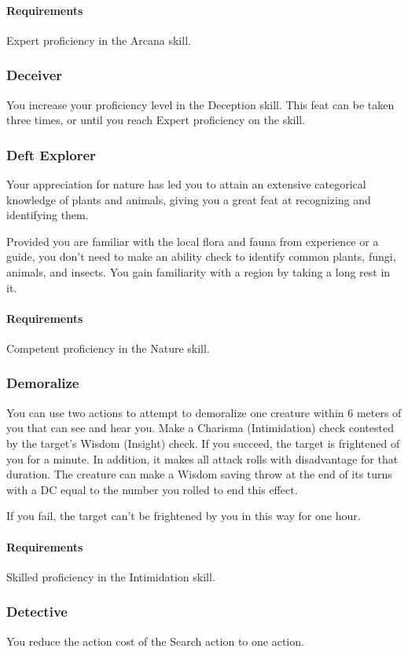     \paragraph{Requirements} Expert proficiency in the Arcana skill.
\subsubsection{Deceiver} \label{feat::deceiver}
    You increase your proficiency level in the Deception skill.
    This feat can be taken three times, or until you reach Expert proficiency on the skill.
\subsubsection{Deft Explorer} \label{feat::deftexplorer}
    Your appreciation for nature has led you to attain an extensive categorical knowledge of plants and animals, giving you a great feat at recognizing and identifying them.

    Provided you are familiar with the local flora and fauna from experience or a guide, you don't need to make an ability check to identify common plants, fungi, animals, and insects.
    You gain familiarity with a region by taking a long rest in it.
    \paragraph{Requirements} Competent proficiency in the Nature skill.
\subsubsection{Demoralize} \label{feat::demoralize}
    You can use two actions to attempt to demoralize one creature within 6 meters of you that can see and hear you.
    Make a Charisma (Intimidation) check contested by the target's Wisdom (Insight) check.
    If you succeed, the target is frightened of you for a minute.
    In addition, it makes all attack rolls with disadvantage for that duration.
    The creature can make a Wisdom saving throw at the end of its turns with a DC equal to the number you rolled to end this effect.

    If you fail, the target can't be frightened by you in this way for one hour.
    \paragraph{Requirements} Skilled proficiency in the Intimidation skill.
\subsubsection{Detective} \label{feat::detective}
    You reduce the action cost of the Search action to one action.
